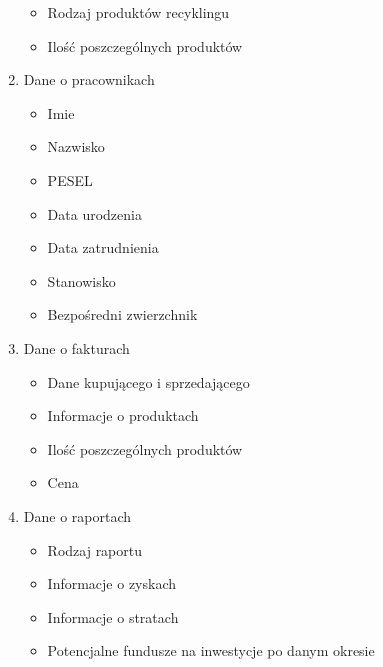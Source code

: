 \begin{enumerate}
	\begin{itemize}
		\item Rodzaj produktów recyklingu
		\item Ilość poszczególnych produktów
	\end{itemize}
	\item Dane o pracownikach
	\begin{itemize}
		\item Imie
		\item Nazwisko
		\item PESEL
		\item Data urodzenia
		\item Data zatrudnienia
		\item Stanowisko
		\item Bezpośredni zwierzchnik
	\end{itemize}
	\item Dane o fakturach 
	\begin{itemize}
		\item Dane kupującego i sprzedającego
		\item Informacje o produktach
		\item Ilość poszczególnych produktów
		\item Cena
	\end{itemize}
	\item Dane o raportach 
	\begin{itemize}
		\item Rodzaj raportu
		\item Informacje o zyskach
		\item Informacje o stratach
		\item Potencjalne fundusze na inwestycje po danym okresie
	\end{itemize}
\end{enumerate}